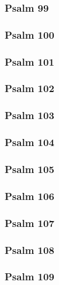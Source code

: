 \documentclass[12pt]{extarticle}
\begin{document}
\begin{multicols}{2}
\subsubsection{Psalm 99}

\newpage

\subsubsection{Psalm 100}

\newpage

\subsubsection{Psalm 101}

\newpage

\subsubsection{Psalm 102}

\newpage

\subsubsection{Psalm 103}

\newpage

\subsubsection{Psalm 104}

\newpage

\subsubsection{Psalm 105}

\newpage

\subsubsection{Psalm 106}

\newpage

\subsubsection{Psalm 107}

\newpage

\subsubsection{Psalm 108}

\newpage

\subsubsection{Psalm 109}

\newpage


\end{multicols}
\end{document}
